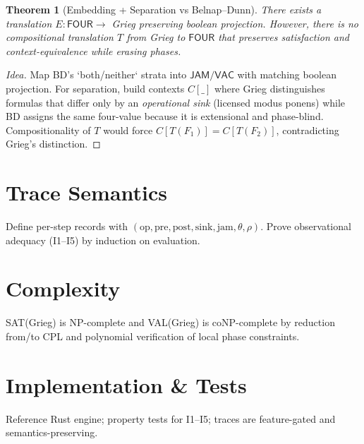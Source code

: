 \documentclass[11pt]{article}
\newtheorem{theorem}{Theorem}
\begin{document}
\begin{theorem}[Embedding + Separation vs Belnap--Dunn]
There exists a translation $E:\mathsf{FOUR}\to$ Grieg preserving boolean projection. However, there is no compositional translation $T$ from Grieg to $\mathsf{FOUR}$ that preserves satisfaction and context-equivalence while erasing phases.
\end{theorem}
\begin{proof}[Idea]
Map BD's `both/neither` strata into $\mathsf{JAM}/\mathsf{VAC}$ with matching boolean projection. For separation, build contexts $C[\_]$ where Grieg distinguishes formulas that differ only by an \emph{operational sink} (licensed modus ponens) while BD assigns the same four-value because it is extensional and phase-blind. Compositionality of $T$ would force $C[T(F_1)]=C[T(F_2)]$, contradicting Grieg's distinction.
\end{proof}

\section{Trace Semantics}
Define per-step records with $(\mathrm{op},\mathrm{pre},\mathrm{post},\mathrm{sink},\mathrm{jam},\theta,\rho)$. Prove observational adequacy (I1–I5) by induction on evaluation.

\section{Complexity}
SAT(Grieg) is NP-complete and VAL(Grieg) is coNP-complete by reduction from/to CPL and polynomial verification of local phase constraints.

\section{Implementation \& Tests}
Reference Rust engine; property tests for I1–I5; traces are feature-gated and semantics-preserving.



\end{document}

